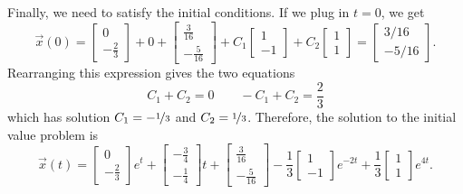 \documentclass{ximera}
\begin{document}
\begin{exampleSol}
Finally, we need to satisfy the initial conditions. If we plug in $t=0$, we get
\begin{equation*}
    \vec{x}(0) = 
    \begin{bmatrix} 
        0 \\ 
        -\frac{2}{3} 
    \end{bmatrix} 
    + 0 + 
    \begin{bmatrix} 
        \frac{3}{16} \\ 
        -\frac{5}{16} 
    \end{bmatrix} 
    + C_1
    \begin{bmatrix} 
        1 \\ 
        -1 
    \end{bmatrix} 
    + C_2 
    \begin{bmatrix} 
        1 \\ 
        1 
    \end{bmatrix} 
    =
    \begin{bmatrix}
        3/16 \\
        -5/16
    \end{bmatrix}.
\end{equation*}
Rearranging this expression gives the two equations
\begin{equation*}
    C_1 + C_2 = 0 \qquad -C_1 + C_2 = \frac{2}{3}
\end{equation*}
which has solution $C_1 = -\nicefrac{1}{3}$ and $C_2 = \nicefrac{1}{3}$. Therefore, the solution to the initial value problem is
\begin{equation*}
    \vec{x}(t) = \begin{bmatrix} 0 \\ -\frac{2}{3} \end{bmatrix} e^t + \begin{bmatrix} -\frac{3}{4} \\ -\frac{1}{4} \end{bmatrix} t + \begin{bmatrix} \frac{3}{16} \\ -\frac{5}{16} \end{bmatrix} - \frac{1}{3}\begin{bmatrix} 1 \\ -1 \end{bmatrix}e^{-2t} + \frac{1}{3}\begin{bmatrix} 1 \\ 1 \end{bmatrix} e^{4t}.
\end{equation*}
\end{exampleSol}
\end{document}
